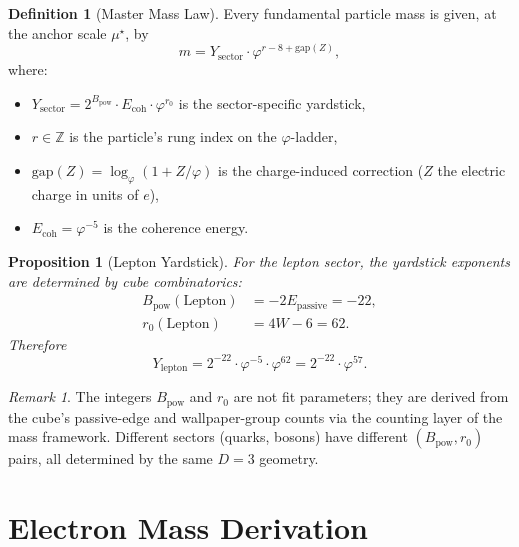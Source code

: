 \documentclass[12pt,a4paper]{article}
\newtheorem{proposition}[theorem]{Proposition}
\theoremstyle{definition}
\newtheorem{definition}[theorem]{Definition}
\theoremstyle{remark}
\newtheorem{remark}[theorem]{Remark}
\begin{document}
\begin{definition}[Master Mass Law]
\label{def:mass-law}
Every fundamental particle mass is given, at the anchor scale
$\mu^\star$, by
\begin{equation}
  \boxed{m = Y_{\mathrm{sector}} \cdot
  \varphi^{r - 8 + \mathrm{gap}(Z)}},
  \label{eq:mass-law}
\end{equation}
where:
\begin{itemize}[nosep]
  \item $Y_{\mathrm{sector}} = 2^{B_{\mathrm{pow}}} \cdot
        E_{\mathrm{coh}} \cdot \varphi^{r_0}$
        is the sector-specific yardstick,
  \item $r \in \mathbb{Z}$ is the particle's rung index on the
        $\varphi$-ladder,
  \item $\mathrm{gap}(Z) = \log_\varphi(1 + Z/\varphi)$ is the
        charge-induced correction ($Z$ the electric charge in
        units of $e$),
  \item $E_{\mathrm{coh}} = \varphi^{-5}$ is the coherence energy.
\end{itemize}
\end{definition}

\begin{proposition}[Lepton Yardstick]
\label{prop:yardstick}
For the lepton sector, the yardstick exponents are determined
by cube combinatorics:
\begin{align}
  B_{\mathrm{pow}}(\mathrm{Lepton})
    &= -2 E_{\mathrm{passive}} = -22, \\
  r_0(\mathrm{Lepton})
    &= 4W - 6 = 62.
\end{align}
Therefore
\begin{equation}
  Y_{\mathrm{lepton}} = 2^{-22} \cdot \varphi^{-5} \cdot
  \varphi^{62} = 2^{-22} \cdot \varphi^{57}.
  \label{eq:yardstick}
\end{equation}
\end{proposition}

\begin{remark}
The integers $B_{\mathrm{pow}}$ and $r_0$ are not fit
parameters; they are derived from the cube's passive-edge and
wallpaper-group counts via the counting layer of the mass
framework.  Different sectors (quarks, bosons) have different
$(B_{\mathrm{pow}}, r_0)$ pairs, all determined by the same
$D = 3$ geometry.
\end{remark}

\section{Electron Mass Derivation}
\label{sec:electron}
\end{document}
